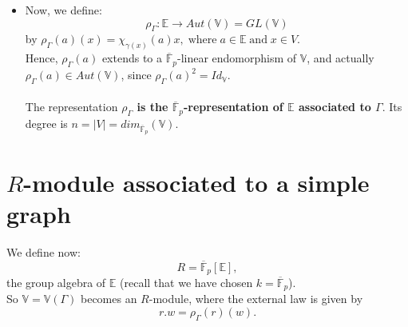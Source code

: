 \documentclass[preprint,12pt,authoryear]{elsarticle}
\theoremstyle{definition}
\begin{document}
\begin{itemize}
\begin{equation}\label{carac}
\chi_{\gamma(x)}(e) =
\begin{cases}
-1 & \text{if }x \in \varepsilon(e)\\
\;\;\; 1& \text{otherwise}.
\end{cases}
\end{equation}

For $u \in \mathbb{E}$  with support $\sigma(u)$, we denote $\Gamma(u)$  the subgraph induced by the edges $e \in \sigma(u)$, i.e. $\Gamma(\sigma(u))$.\\

Let 
\[
a=\oplus_{e \in E}a_e e, \; a_e \in \mathbb{F}_2\; \textrm{and } u=\oplus_{e \in E}b_e e, \; b_e \in \mathbb{F}_2; 
\]
we have: 
$$
 \chi_{a}(u)=\chi_{a}(\underset{e \in \sigma(u)}{\oplus}b_{e}e)\\
= \prod_{e \in \sigma(u)}\chi_{a}(e)=\prod_{e \in \sigma(u)\cap \sigma(a)} (-1)^{a_{e}}
= (-1)^{\vert \sigma(u)\cap \sigma(a)\vert}.
$$

It implies that 
\begin{equation}\label{ki}
 \chi_{\gamma(x)}(u)= (-1)^{\vert \sigma(a)\cap \gamma(x)\vert}= (-1)^{deg_{\Gamma(u)}(x)}.
\end{equation}

\item[-]  Now, we define: 
\begin{equation}\label{rho}
 \rho_{\Gamma}: \mathbb{E} \longrightarrow Aut(\mathbb{V})=GL(\mathbb{V}) 
 \end{equation}
by $\rho_{\Gamma}(a)(x)=\chi_{\gamma(x)}(a)x,\;   \textrm{where}\;   a\in \mathbb{E}\; \textrm{and}\;   x \in V.$ \\
Hence,  $\rho_{\Gamma}(a)$ extends to a  $\overline{\mathbb{F}}_p$-linear endomorphism of $\mathbb{V}$, and actually 
$\rho_{\Gamma}(a) \in Aut(\mathbb{V})$, since $\rho_{\Gamma}(a)^2=Id_{\mathbb{V}}$. \\\\


The  representation  {\bf $\rho_{\Gamma}$ is  the $\overline{\mathbb{F}}_p$-representation of $\mathbb{E}$ associated to $\Gamma$}. Its  degree is $n=|V|= dim_{\overline{\mathbb{F}}_p} (\mathbb{V})$.
\end{itemize}



\section{$R$-module associated to a simple graph}
We define now: 
$$ R= \overline{\mathbb{F}}_p[\mathbb{E}], $$
the group algebra of $\mathbb{E}$ (recall that we have chosen  $k=\overline{\mathbb{F}}_p$).\\
So $\mathbb{V}=\mathbb{V}(\Gamma)$ becomes an $R$-module, where the  external law is given by
\begin{equation}
r.w=\rho_{\Gamma}(r)(w).
\end{equation}
\end{document}
